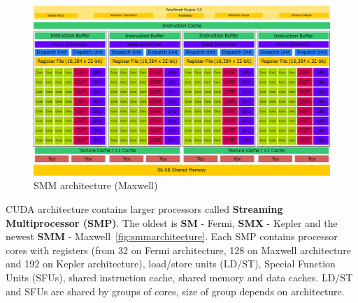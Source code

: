 \begin{figure}[h]
\centering
  \includegraphics[width=1\linewidth]{img/SMMArchitecture.eps}
  \caption{SMM architecture (Maxwell)}
  \label{fig:smmarchitecture}
\end{figure}

CUDA architecture contains larger processors called \textbf{Streaming Multiprocessor (SMP)}. The oldest is \textbf{SM} - Fermi, \textbf{SMX} - Kepler and the newest \textbf{SMM} - Maxwell~\autoref{fig:smmarchitecture}. Each SMP contains processor cores with registers (from 32 on Fermi architecture, 128 on Maxwell architecture and 192 on Kepler architecture), load/store units (LD/ST), Special Function Units (SFUs), shared instruction cache, shared memory and data caches. LD/ST and SFUs are shared by groups of cores, size of group depends on architecture.

